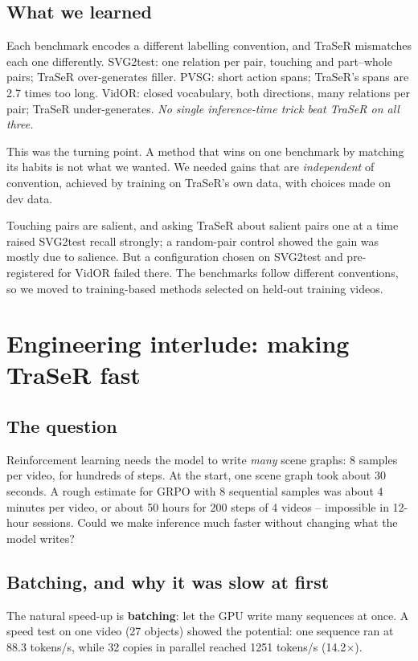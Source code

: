 \documentclass[11pt,openany]{book}
\newcommand{\qsec}{\section*{The question}}
\newcommand{\lsec}{\section*{What we learned}}
\begin{document}
\lsec
\begin{keyidea}
Each benchmark encodes a different labelling convention, and TraSeR mismatches each one differently. SVG2test: one relation per
pair, touching and part--whole pairs; TraSeR over-generates filler. PVSG: short action spans; TraSeR's spans are 2.7 times too
long. VidOR: closed vocabulary, both directions, many relations per pair; TraSeR under-generates. \emph{No single inference-time
trick beat TraSeR on all three.}
\end{keyidea}
This was the turning point. A method that wins on one benchmark by matching its habits is not what we wanted. We needed gains that
are \emph{independent} of convention, achieved by training on TraSeR's own data, with choices made on dev data.

\begin{summarybox}
Touching pairs are salient, and asking TraSeR about salient pairs one at a time raised SVG2test recall strongly; a random-pair
control showed the gain was mostly due to salience. But a configuration chosen on SVG2test and pre-registered for VidOR failed
there. The benchmarks follow different conventions, so we moved to training-based methods selected on held-out training videos.
\end{summarybox}

\chapter{Engineering interlude: making TraSeR fast}\label{ch:engine}

\qsec
Reinforcement learning needs the model to write \emph{many} scene graphs: 8 samples per video, for hundreds of steps. At the start,
one scene graph took about 30 seconds. A rough estimate for GRPO with 8 sequential samples was about 4 minutes per video, or about
50 hours for 200 steps of 4 videos -- impossible in 12-hour sessions. Could we make inference much faster without changing what the
model writes?

\section{Batching, and why it was slow at first}
The natural speed-up is \textbf{batching}: let the GPU write many sequences at once. A speed test on one video (27 objects) showed
the potential: one sequence ran at 88.3 tokens/s, while 32 copies in parallel reached 1251 tokens/s (14.2$\times$).
\end{document}
